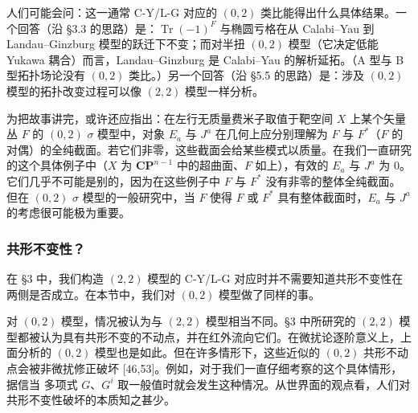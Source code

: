 
\label{op:86}
人们可能会问：这一通常 C-Y/L-G 对应的 $(0,2)$ 类比能得出什么具体结果。一个回答（沿 §3.3 的思路）是：$\operatorname{Tr}(-1)^F$ 与椭圆亏格在从 Calabi--Yau 到 Landau--Ginzburg 模型的跃迁下不变；而对半扭 $(0,2)$ 模型（它决定低能 Yukawa 耦合）而言，Landau--Ginzburg 是 Calabi--Yau 的解析延拓。（A 型与 B 型拓扑场论没有 $(0,2)$ 类比。）另一个回答（沿 §5.5 的思路）是：涉及 $(0,2)$ 模型的拓扑改变过程可以像 $(2,2)$ 模型一样分析。

为把故事讲完，或许还应指出：在左行无质量费米子取值于靶空间 $X$ 上某个矢量丛 $F$ 的 $(0,2)$ $\sigma$ 模型中，对象 $E_a$ 与 $J^a$ 在几何上应分别理解为 $F$ 与 $F^*$（$F$ 的对偶）的全纯截面。若它们非零，这些截面会给某些模式以质量。在我们一直研究的这个具体例子中（$X$ 为 $\mathbf{CP}^{n-1}$ 中的超曲面、$F$ 如上），有效的 $E_a$ 与 $J^a$ 为 0。它们几乎不可能是别的，因为在这些例子中 $F$ 与 $F^*$ 没有非零的整体全纯截面。但在 $(0,2)$ $\sigma$ 模型的一般研究中，当 $F$ 使得 $F$ 或 $F^*$ 具有整体截面时，$E_a$ 与 $J^a$ 的考虑很可能极为重要。


\subsubsection*{共形不变性？}

在 §3 中，我们构造 $(2,2)$ 模型的 C-Y/L-G 对应时并不需要知道共形不变性在两侧是否成立。在本节中，我们对 $(0,2)$ 模型做了同样的事。

对 $(0,2)$ 模型，情况被认为与 $(2,2)$ 模型相当不同。§3 中所研究的 $(2,2)$ 模型都被认为具有共形不变的不动点，并在红外流向它们。在微扰论逐阶意义上，上面分析的 $(0,2)$ 模型也是如此。但在许多情形下，这些近似的 $(0,2)$ 共形不动点会被非微扰修正破坏 [46,53]。例如，对于我们一直仔细考察的这个具体情形，据信当
\label{op:87}
多项式 $G$、$G^i$ 取一般值时就会发生这种情况。从世界面的观点看，人们对共形不变性破坏的本质知之甚少。

